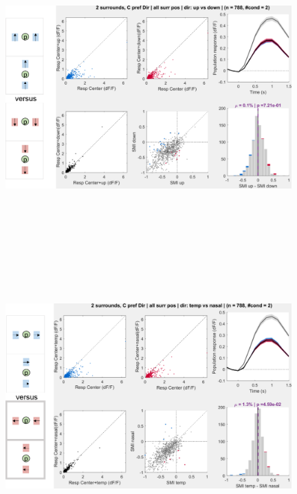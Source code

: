 \begin{figure}[H] \centering \includegraphics[width=11cm,height=11cm,keepaspectratio]{Figures/7.Results/population/sel/diagrams/4.png} 
\end{figure}

\begin{figure}[H] \centering \includegraphics[width=11cm,height=11cm,keepaspectratio]{Figures/7.Results/population/sel/diagrams/5.png} 
\end{figure}

